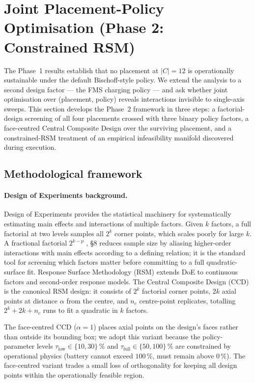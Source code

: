 \documentclass[conference]{IEEEtran}
\begin{document}
\section{Joint Placement-Policy Optimisation (Phase 2: Constrained RSM)}
\label{sec:phase2}

The Phase~1 results establish that no placement at $|C| = 12$ is operationally sustainable under the default Bischoff-style policy. We extend the analysis to a second design factor --- the FMS charging policy --- and ask whether joint optimisation over (placement, policy) reveals interactions invisible to single-axis sweeps. This section develops the Phase~2 framework in three steps: a factorial-design screening of all four placements crossed with three binary policy factors, a face-centred Central Composite Design over the surviving placement, and a constrained-RSM treatment of an empirical infeasibility manifold discovered during execution.

\subsection{Methodological framework}
\label{sec:phase2_method}

\paragraph{Design of Experiments background.}
Design of Experiments \cite{montgomery2017,box2005} provides the statistical machinery for systematically estimating main effects and interactions of multiple factors. Given $k$ factors, a full factorial at two levels samples all $2^k$ corner points, which scales poorly for large $k$. A fractional factorial $2^{k-p}$ \cite{montgomery2017}, \S 8 reduces sample size by aliasing higher-order interactions with main effects according to a defining relation; it is the standard tool for screening which factors matter before committing to a full quadratic-surface fit. Response Surface Methodology (RSM) \cite{box1951,myers2016,khuri1996} extends DoE to continuous factors and second-order response models. The Central Composite Design (CCD) \cite{box1951} is the canonical RSM design: it consists of $2^k$ factorial corner points, $2k$ axial points at distance $\alpha$ from the centre, and $n_c$ centre-point replicates, totalling $2^k + 2k + n_c$ runs to fit a quadratic in $k$ factors.

The face-centred CCD ($\alpha = 1$) places axial points on the design's faces rather than outside its bounding box; we adopt this variant because the policy-parameter levels $\tau_\text{low} \in \{10,30\}\,\%$ and $\tau_\text{full} \in \{50,100\}\,\%$ are constrained by operational physics (battery cannot exceed $100\,\%$, must remain above $0\,\%$). The face-centred variant trades a small loss of orthogonality for keeping all design points within the operationally feasible region.
\end{document}
